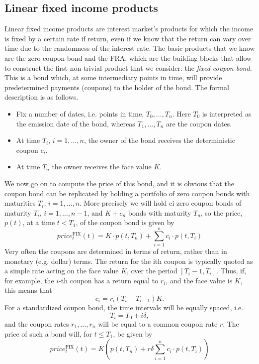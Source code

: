 \subsection{Linear fixed income products}
Linear fixed income products are interest market's products for which the income is fixed by a certain rate if return, even if we know that the return can vary over time due to the randomness of the interest rate. The basic products that we know are the zero coupon bond and the FRA, which are the building blocks that allow to construct the first non trivial product that we consider: the \emph{fixed coupon bond}. This is a bond which, at some intermediary points in time, will provide predetermined payments (coupons) to the holder of the bond. The formal description is as follows.
\begin{itemize}
    \item Fix a number of dates, i.e. points in time, $T_0, \dots, T_n$. Here $T_0$ is interpreted as the emission date of the bond, whereas $T_1, \dots, T_n$ are the coupon dates.
    \item At time $T_i$, $i = 1,\dots, n$, the owner of the bond receives the deterministic
    coupon $c_i$.
    \item At time $T_n$ the owner receives the face value $K$.
\end{itemize}
We now go on to compute the price of this bond, and it is obvious that the coupon bond can be replicated by holding a portfolio of zero coupon bonds with maturities $T_i$, $i = 1,\dots, n$. More precisely we will hold ci zero coupon bonds of maturity $T_i$, $i = 1,\dots, n-1$, and $K+c_n$ bonds with maturity $T_n$, so the price, $p(t)$, at a time $t < T_1$, of the coupon bond is given by
\begin{equation}
    price_t^{\text{FIX}}(t) = K\cdot p(t,T_n) + \sum_{i=1}^n c_i\cdot p(t,T_i)
\end{equation}
Very often the coupons are determined in terms of return, rather than in monetary (e.g. dollar) terms. The return for the ith coupon is typically quoted as a simple rate acting on the face value $K$, over the period $[T_i-1,T_i]$. Thus, if, for example, the $i$-th coupon has a return equal to $r_i$, and the face value is $K$, this means that
\begin{equation*}
    c_i = r_i(T_i - T_{i-1})K.
\end{equation*}
For a standardized coupon bond, the time intervals will be equally spaced, i.e.
\begin{equation*}
    T_i = T_0 + i\delta,
\end{equation*}
and the coupon rates $r_1,\dots,r_n$ will be equal to a common coupon rate $r$. The
price of such a bond will, for $t \le T_1$, be given by
\begin{equation}
    price_t^{\text{FIX}}(t) = K\left(p(t,T_n) + r\delta\sum_{i=1}^n c_i\cdot p(t,T_i)\right)
\end{equation}

